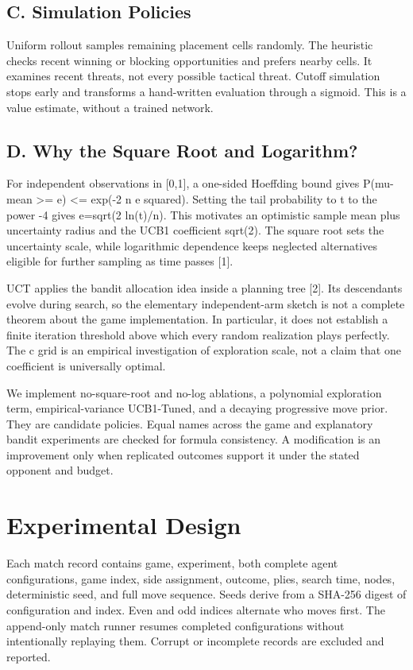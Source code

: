 \documentclass[conference]{IEEEtran}
\begin{document}
\subsection{C. Simulation Policies}

Uniform rollout samples remaining placement cells randomly. The heuristic checks recent winning or blocking opportunities and prefers nearby cells. It examines recent threats, not every possible tactical threat. Cutoff simulation stops early and transforms a hand-written evaluation through a sigmoid. This is a value estimate, without a trained network.


\subsection{D. Why the Square Root and Logarithm?}

For independent observations in [0,1], a one-sided Hoeffding bound gives P(mu-mean >= e) <= exp(-2 n e squared). Setting the tail probability to t to the power -4 gives e=sqrt(2 ln(t)/n). This motivates an optimistic sample mean plus uncertainty radius and the UCB1 coefficient sqrt(2). The square root sets the uncertainty scale, while logarithmic dependence keeps neglected alternatives eligible for further sampling as time passes [1].


UCT applies the bandit allocation idea inside a planning tree [2]. Its descendants evolve during search, so the elementary independent-arm sketch is not a complete theorem about the game implementation. In particular, it does not establish a finite iteration threshold above which every random realization plays perfectly. The c grid is an empirical investigation of exploration scale, not a claim that one coefficient is universally optimal.


We implement no-square-root and no-log ablations, a polynomial exploration term, empirical-variance UCB1-Tuned, and a decaying progressive move prior. They are candidate policies. Equal names across the game and explanatory bandit experiments are checked for formula consistency. A modification is an improvement only when replicated outcomes support it under the stated opponent and budget.


\section{Experimental Design}

Each match record contains game, experiment, both complete agent configurations, game index, side assignment, outcome, plies, search time, nodes, deterministic seed, and full move sequence. Seeds derive from a SHA-256 digest of configuration and index. Even and odd indices alternate who moves first. The append-only match runner resumes completed configurations without intentionally replaying them. Corrupt or incomplete records are excluded and reported.
\end{document}
